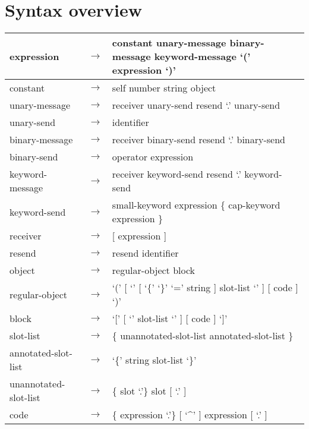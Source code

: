 \documentclass[letterpaper,10pt,english]{sphinxmanual}
\begin{document}
\section{Syntax overview}
\label{\detokenize{syntaxoverview:syntax-overview}}\label{\detokenize{syntaxoverview::doc}}
\noindent\begin{tabulary}{\linewidth}{|L|L|L|}
\hline

expression
&
\(\rightarrow\)
&
constant \textbar{} unary-message \textbar{} binary-message \textbar{} keyword-message \textbar{} ‘(’ expression ‘)’
\\
\hline
constant
&
\(\rightarrow\)
&
self \textbar{} number \textbar{} string \textbar{} object
\\
\hline
unary-message
&
\(\rightarrow\)
&
receiver unary-send \textbar{} resend ‘.’ unary-send
\\
\hline
unary-send
&
\(\rightarrow\)
&
identifier
\\
\hline
binary-message
&
\(\rightarrow\)
&
receiver binary-send \textbar{} resend ‘.’ binary-send
\\
\hline
binary-send
&
\(\rightarrow\)
&
operator expression
\\
\hline
keyword-message
&
\(\rightarrow\)
&
receiver keyword-send \textbar{} resend ‘.’ keyword-send
\\
\hline
keyword-send
&
\(\rightarrow\)
&
small-keyword expression \{ cap-keyword expression \}
\\
\hline
receiver
&
\(\rightarrow\)
&
{[} expression {]}
\\
\hline
resend
&
\(\rightarrow\)
&
resend \textbar{} identifier
\\
\hline
object
&
\(\rightarrow\)
&
regular-object \textbar{} block
\\
\hline
regular-object
&
\(\rightarrow\)
&
‘(’ {[} ‘\textbar{}’ {[} ‘\{’ ‘\}’ ‘=’ string {]} slot-list ‘\textbar{}’ {]} {[} code {]} ‘)’
\\
\hline
block
&
\(\rightarrow\)
&
‘{[}’ {[} ‘\textbar{}’ slot-list    ‘\textbar{}’ {]} {[} code {]} ‘{]}’
\\
\hline
slot-list
&
\(\rightarrow\)
&
\{ unannotated-slot-list \textbar{} annotated-slot-list \}
\\
\hline
annotated-slot-list
&
\(\rightarrow\)
&
‘\{’ string slot-list ‘\}’
\\
\hline
unannotated-slot-list
&
\(\rightarrow\)
&
\{ slot ‘.’\} slot {[} ‘.’ {]}
\\
\hline
code
&
\(\rightarrow\)
&
\{ expression ‘.’\} {[} ‘\textasciicircum{}’ {]} expression {[} ‘.’ {]}

\end{tabulary}
\end{document}
